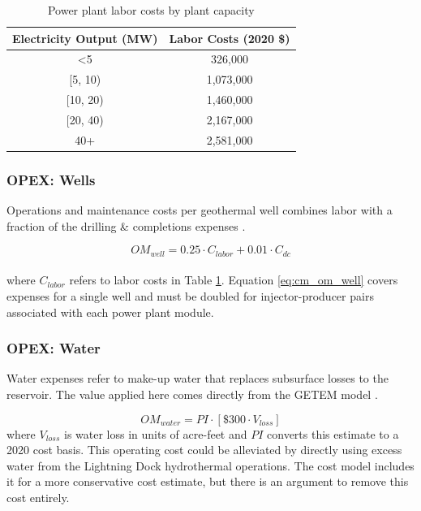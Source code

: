 \begin{table}[!htp]
\centering
\begin{tabular}{|c|c|}
\hline
\textbf{Electricity Output (MW)} & \textbf{Labor Costs (2020 \$)} \\ \hline
\textless 5 & 326,000 \\ \hline
{[}5, 10) & 1,073,000 \\ \hline
{[}10, 20) & 1,460,000 \\ \hline
{[}20, 40) & 2,167,000 \\ \hline
40+ & 2,581,000 \\ \hline
\end{tabular}
\caption[Power plant labor costs]{Power plant labor costs by plant capacity  \protect\citep{beckers_introducing_2013}}
\label{tab:labor_costs}
\end{table}

\subsubsection{OPEX: Wells}
\label{ch4:cm_opex_well}

Operations and maintenance costs per geothermal well combines labor with a fraction of the drilling \& completions expenses \citep[Equation 12,\ ][]{beckers_introducing_2013}.

\begin{equation}
\label{eq:cm_om_well}
    OM_{well} = 0.25 \cdot C_{labor} + 0.01 \cdot C_{dc}
\end{equation}
\\
where $C_{labor}$ refers to labor costs in Table \ref{tab:labor_costs}. Equation \ref{eq:cm_om_well} covers expenses for a single well and must be doubled for injector-producer pairs associated with each power plant module.

\subsubsection{OPEX: Water}
\label{ch4:cm_opex_water}

Water expenses refer to make-up water that replaces subsurface losses to the reservoir. The value applied here comes directly from the GETEM model \citep{eere_getem_2012}.

\begin{equation}
\label{eq:cm_om_water}
    OM_{water} = PI \cdot \left[\$300 \cdot V_{loss}\right]
\end{equation}
where $V_{loss}$ is water loss in units of acre-feet and $PI$ converts this estimate to a 2020 cost basis. This operating cost could be alleviated by directly using excess water from the Lightning Dock hydrothermal operations. The cost model includes it for a more conservative cost estimate, but there is an argument to remove this cost entirely.

